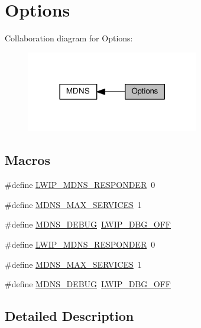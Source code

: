 \hypertarget{group__mdns__opts}{}\section{Options}
\label{group__mdns__opts}
Collaboration diagram for Options\+:
\nopagebreak
\begin{figure}[H]
\begin{center}
\leavevmode
\includegraphics[width=213pt]{group__mdns__opts}
\end{center}
\end{figure}
\subsection*{Macros}
\begin{DoxyCompactItemize}
\item 
\#define \hyperlink{group__mdns__opts_gac94cc7a48fb5352f49a9e00594e89ea8}{L\+W\+I\+P\+\_\+\+M\+D\+N\+S\+\_\+\+R\+E\+S\+P\+O\+N\+D\+ER}~0
\item 
\#define \hyperlink{group__mdns__opts_ga82749ee08be21967b6daf577b9710ac6}{M\+D\+N\+S\+\_\+\+M\+A\+X\+\_\+\+S\+E\+R\+V\+I\+C\+ES}~1
\item 
\#define \hyperlink{group__mdns__opts_ga53a97502efdcf1214cab4078f93a6dc9}{M\+D\+N\+S\+\_\+\+D\+E\+B\+UG}~\hyperlink{group__debugging__levels_gadab1cdc3f45939a3a5c9a3d7e04987e1}{L\+W\+I\+P\+\_\+\+D\+B\+G\+\_\+\+O\+FF}
\item 
\#define \hyperlink{group__mdns__opts_gac94cc7a48fb5352f49a9e00594e89ea8}{L\+W\+I\+P\+\_\+\+M\+D\+N\+S\+\_\+\+R\+E\+S\+P\+O\+N\+D\+ER}~0
\item 
\#define \hyperlink{group__mdns__opts_ga82749ee08be21967b6daf577b9710ac6}{M\+D\+N\+S\+\_\+\+M\+A\+X\+\_\+\+S\+E\+R\+V\+I\+C\+ES}~1
\item 
\#define \hyperlink{group__mdns__opts_ga53a97502efdcf1214cab4078f93a6dc9}{M\+D\+N\+S\+\_\+\+D\+E\+B\+UG}~\hyperlink{group__debugging__levels_gadab1cdc3f45939a3a5c9a3d7e04987e1}{L\+W\+I\+P\+\_\+\+D\+B\+G\+\_\+\+O\+FF}
\end{DoxyCompactItemize}


\subsection{Detailed Description}


